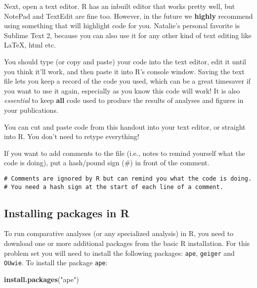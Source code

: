 \documentclass[11pt]{article}
\newcommand{\KeywordTok}[1]{\textcolor[rgb]{0.13,0.29,0.53}{\textbf{{#1}}}}
\newcommand{\StringTok}[1]{\textcolor[rgb]{0.31,0.60,0.02}{{#1}}}
\newcommand{\NormalTok}[1]{{#1}}
\begin{document}
Next, open a text editor. R has an inbuilt editor that works pretty
well, but NotePad and TextEdit are fine too. However, in the future we
\textbf{highly} recommend using something that will highlight code for
you. Natalie's personal favorite is Sublime Text 2, because you can also use
it for any other kind of text editing like LaTeX, html etc.

You should type (or copy and paste) your code into the text editor, edit
it until you think it'll work, and then paste it into R's console
window. Saving the text file lets you keep a record of the code you
used, which can be a great timesaver if you want to use it again,
especially as you know this code will work! It is also \emph{essential} to
keep \textbf{all} code used to produce the results of analyses and figures
in your publications.

\begin{framed}
You can cut and paste code from this handout into your text editor, or 
straight into R. You don't need to retype everything!
\end{framed}

If you want to add comments to the file (i.e., notes to remind yourself
what the code is doing), put a hash/pound sign (\#) in front of the
comment.

\begin{snugshade}
\texttt{\# Comments are ignored by R but can remind you what the code is doing.\\}
\texttt{\# You need a hash sign at the start of each line of a comment.}
\end{snugshade}

\subsection{Installing packages in R}\label{installing-packages}

To run comparative analyses (or any specialized analysis) in R, you need to 
download one or more additional packages from the basic R installation. 
For this problem set you will need to install the following packages: 
\texttt{ape}, \texttt{geiger} and \texttt{OUwie}. 
To install the package \texttt{ape}:

\begin{snugshade}
\begin{Highlighting}[]
\KeywordTok{install.packages}\NormalTok{(}\StringTok{"ape"}\NormalTok{)}
\end{Highlighting}
\end{snugshade}
\end{document}
